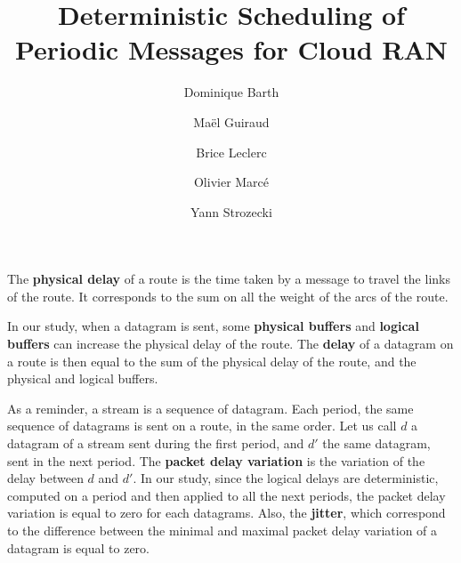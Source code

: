 \documentclass[10pt]{article}
\title{Deterministic Scheduling of Periodic Messages for Cloud RAN}
\author[1]{Dominique Barth}
\author[1,2]{Ma\"el Guiraud}
\author[2]{Brice Leclerc}
\author[2]{Olivier Marc\'e}
\author[1]{Yann Strozecki}
\affil[1]{David Laboratory, UVSQ}
\affil[2]{Nokia Bell Labs France}
\begin{document}
The {\bf physical delay} of a route is the time taken by a message to travel the links of the route. It corresponds to the sum on all the weight of the arcs of the route. \cite{guillemin_peak_1992,demichelis_ip_nodate} 

In our study, when a datagram is sent, some {\bf physical buffers } and {\bf logical buffers} can increase the physical delay of the route. The {\bf delay} of a datagram on a route is then equal to the sum of the physical delay of the route, and the physical and logical buffers.

As a reminder, a stream is a sequence of datagram. Each period, the same sequence of datagrams is sent on a route, in the same order. Let us call $d$ a datagram of a stream sent during the first period, and $d'$ the same datagram, sent in the next period.
The {\bf packet delay variation} is the variation of the delay between $d$ and $d'$. In our study, since the logical delays are deterministic, computed on a period and then applied to all the next periods, the packet delay variation is equal to zero for each datagrams.
Also, the {\bf jitter}, which correspond to the difference between the minimal and maximal packet delay variation of a datagram is equal to zero.



\end{document}
